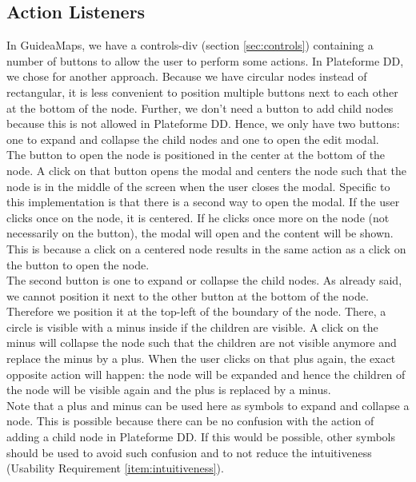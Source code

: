 \subsection{Action Listeners}\label{sec:usecase-actionlisteners}
In GuideaMaps, we have a controls-div (section \ref{sec:controls}) containing a number of buttons to allow the user to perform some actions. In Plateforme DD, we chose for another approach. Because we have circular nodes instead of rectangular, it is less convenient to position multiple buttons next to each other at the bottom of the node. Further, we don't need a button to add child nodes because this is not allowed in Plateforme DD. Hence, we only have two buttons: one to expand and collapse the child nodes and one to open the edit modal.\\

The button to open the node is positioned in the center at the bottom of the node. A click on that button opens the modal and centers the node such that the node is in the middle of the screen when the user closes the modal. Specific to this implementation is that there is a second way to open the modal. If the user clicks once on the node, it is centered. If he clicks once more on the node (not necessarily on the button), the modal will open and the content will be shown. This is because a click on a centered node results in the same action as a click on the button to open the node.\\

The second button is one to expand or collapse the child nodes. As already said, we cannot position it next to the other button at the bottom of the node. Therefore we position it at the top-left of the boundary of the node. There, a circle is visible with a minus inside if the children are visible. A click on the minus will collapse the node such that the children are not visible anymore and replace the minus by a plus. When the user clicks on that plus again, the exact opposite action will happen: the node will be expanded and hence the children of the node will be visible again and the plus is replaced by a minus.\\

Note that a plus and minus can be used here as symbols to expand and collapse a node. This is possible because there can be no confusion with the action of adding a child node in Plateforme DD. If this would be possible, other symbols should be used to avoid such confusion and to not reduce the intuitiveness (Usability Requirement \ref{item:intuitiveness}).


